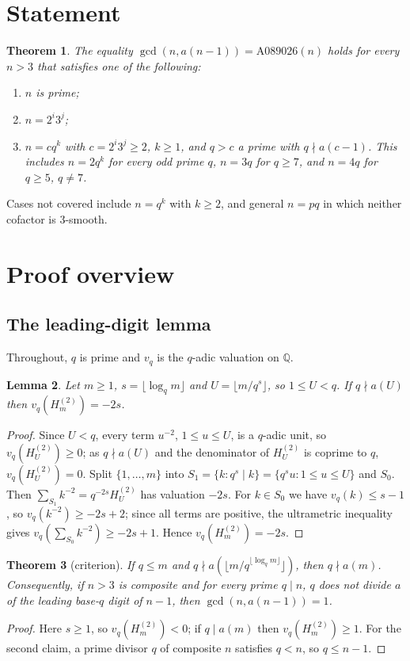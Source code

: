 \documentclass[11pt]{article}
\newtheorem{theorem}{Theorem}
\newtheorem{lemma}[theorem]{Lemma}
\theoremstyle{remark}\newtheorem{remark}[theorem]{Remark}
\newcommand{\Hh}{H^{(2)}}
\begin{document}
\section{Statement}
\begin{theorem}\label{thm:main}
The equality $\gcd(n,a(n-1))=\mathrm{A089026}(n)$ holds for every $n>3$ that satisfies one of the following:
\begin{enumerate}
\item $n$ is prime;
\item $n=2^i3^j$;
\item $n=cq^k$ with $c=2^i3^j\ge2$, $k\ge1$, and $q>c$ a prime with $q\nmid a(c-1)$. This includes $n=2q^k$ for every odd prime $q$, $n=3q$ for $q\ge7$, and $n=4q$ for $q\ge5$, $q\ne7$.
\end{enumerate}
\end{theorem}
\noindent Cases not covered include $n=q^k$ with $k\ge2$, and general $n=pq$ in which neither cofactor is $3$-smooth.

\section{Proof overview}
\subsection{The leading-digit lemma}
Throughout, $q$ is prime and $v_q$ is the $q$-adic valuation on $\mathbb{Q}$.
\begin{lemma}\label{lem:key}
Let $m\ge1$, $s=\lfloor\log_q m\rfloor$ and $U=\lfloor m/q^s\rfloor$, so $1\le U<q$. If $q\nmid a(U)$ then $v_q(\Hh_m)=-2s$.
\end{lemma}
\begin{proof}
Since $U<q$, every term $u^{-2}$, $1\le u\le U$, is a $q$-adic unit, so $v_q(\Hh_U)\ge0$; as $q\nmid a(U)$ and the denominator of $\Hh_U$ is coprime to $q$, $v_q(\Hh_U)=0$. Split $\{1,\dots,m\}$ into $S_1=\{k:q^s\mid k\}=\{q^su:1\le u\le U\}$ and $S_0$. Then $\sum_{S_1}k^{-2}=q^{-2s}\Hh_U$ has valuation $-2s$. For $k\in S_0$ we have $v_q(k)\le s-1$, so $v_q(k^{-2})\ge -2s+2$; since all terms are positive, the ultrametric inequality gives $v_q(\sum_{S_0}k^{-2})\ge-2s+1$. Hence $v_q(\Hh_m)=-2s$.
\end{proof}
\begin{theorem}[criterion]\label{thm:crit}
If $q\le m$ and $q\nmid a(\lfloor m/q^{\lfloor\log_q m\rfloor}\rfloor)$, then $q\nmid a(m)$. Consequently, if $n>3$ is composite and for every prime $q\mid n$, $q$ does not divide $a$ of the leading base-$q$ digit of $n-1$, then $\gcd(n,a(n-1))=1$.
\end{theorem}
\begin{proof}
Here $s\ge1$, so $v_q(\Hh_m)<0$; if $q\mid a(m)$ then $v_q(\Hh_m)\ge1$. For the second claim, a prime divisor $q$ of composite $n$ satisfies $q<n$, so $q\le n-1$.
\end{proof}
\end{document}
